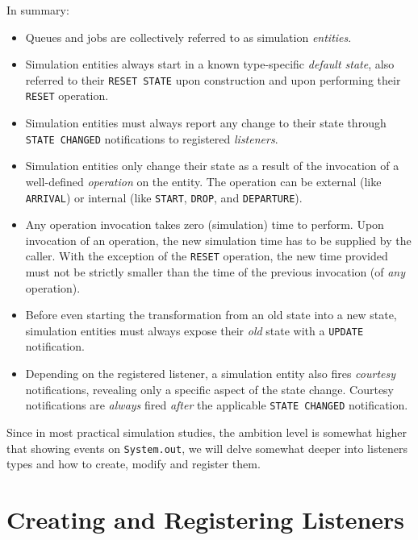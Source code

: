 \documentclass[12pt]{book}
\begin{document}
In summary:
\begin{itemize}
  \item Queues and jobs are collectively referred to as simulation {\em entities}.
  \item Simulation entities always start in a known type-specific {\em default state},
          also referred to their \lstinline|RESET STATE| upon construction
          and upon performing their \lstinline|RESET| operation.
  \item Simulation entities must always report any change to their state through
	  \lstinline|STATE CHANGED| notifications to registered {\em listeners}.
  \item Simulation entities only change their state
          as a result of the invocation of a well-defined
          {\em operation\/} on the entity.
        The operation can be external (like \lstinline-ARRIVAL-)
          or internal (like \lstinline-START-, \lstinline-DROP-, and \lstinline-DEPARTURE-).
  \item Any operation invocation takes zero (simulation) time to perform.
        Upon invocation of an operation, the new simulation time has to be supplied
          by the caller.
        With the exception of the \lstinline|RESET| operation,
          the new time provided must not be strictly smaller than the
          time of the previous invocation (of {\em any\/} operation).
  \item Before even starting the transformation from an old state into a new state,
	  simulation entities must always expose their {\em old\/} state
	  with a \lstinline|UPDATE| notification.
  \item Depending on the registered listener,
	  a simulation entity also fires {\em courtesy\/} notifications,
          revealing only a specific aspect of the state change.
        Courtesy notifications are {\em always\/} fired {\em after\/}
          the applicable \lstinline|STATE CHANGED| notification.
\end{itemize}

Since in most practical simulation studies,
  the ambition level is somewhat higher that showing events on \lstinline|System.out|,
  we will delve somewhat deeper into listeners types and how
  to create, modify and register them.

\section{Creating and Registering Listeners}
\end{document}

